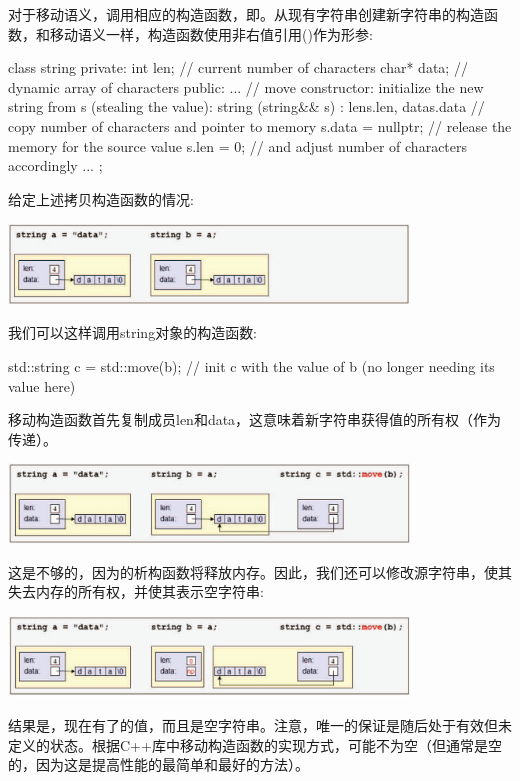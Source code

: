 对于移动语义，调用相应的构造函数，即。从现有字符串创建新字符串的构造函数，和移动语义一样，构造函数使用非右值引用(\cppinline{\&\&})作为形参:

\begin{cppcode}
class string {
	private:
	int len; // current number of characters
	char* data; // dynamic array of characters
	public:
	...
	// move constructor: initialize the new string from s (stealing the value):
	string (string&& s)
	: len{s.len}, data{s.data} { // copy number of characters and pointer to memory
		s.data = nullptr; // release the memory for the source value
		s.len = 0; // and adjust number of characters accordingly
	}
	...
};
\end{cppcode}

给定上述拷贝构造函数的情况:

\begin{center}
	\includegraphics[width=0.8\textwidth]{part1/ch1/images/20}
\end{center}

我们可以这样调用string对象的构造函数:

\begin{cppcode}
std::string c = std::move(b); // init c with the value of b (no longer needing its value here)
\end{cppcode}

移动构造函数首先复制成员len和data，这意味着新字符串获得值的所有权（作为传递）。

\begin{center}
	\includegraphics[width=0.8\textwidth]{part1/ch1/images/21}
\end{center}

这是不够的，因为的析构函数将释放内存。因此，我们还可以修改源字符串，使其失去内存的所有权，并使其表示空字符串:

\begin{center}
	\includegraphics[width=0.8\textwidth]{part1/ch1/images/22}
\end{center}

结果是，现在有了的值，而且是空字符串。注意，唯一的保证是随后处于有效但未定义的状态。根据C++库中移动构造函数的实现方式，可能不为空（但通常是空的，因为这是提高性能的最简单和最好的方法）。


















